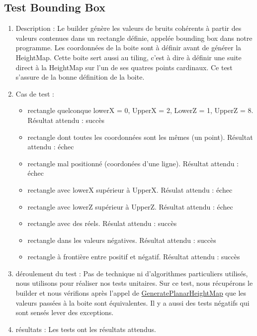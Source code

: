 \documentclass[12pt]{report}
\begin{document}
\subsection{Test Bounding Box}
\begin{enumerate}
    \item Description : Le builder génère les valeurs de bruits cohérents à partir des valeurs contenues dans un rectangle définie, appelée bounding box dans notre programme. Les coordonnées de la boite sont à définir avant de générer la HeightMap. Cette boite sert aussi au tiling, c'est à dire à définir une suite direct à la HeightMap sur l'un de ses quatres points cardinaux. Ce test s'assure de la bonne définition de la boite.
    \item Cas de test : 
    \begin{itemize}
        \item rectangle quelconque lowerX = 0, UpperX = 2, LowerZ = 1, UpperZ = 8. Résultat attendu : succès
        \item rectangle dont toutes les coordonnées sont les mêmes (un point). Résultat attendu : échec
        \item rectangle mal positionné (coordonées d'une ligne). Résultat attendu : échec
        \item rectangle avec lowerX supérieur à UpperX. Résulat attendu : échec
        \item rectangle avec lowerZ supérieur à UpperZ. Résultat attendu : échec
        \item rectangle avec des réels. Résulat attendu : succès
        \item rectangle dans les valeurs négatives. Résultat attendu : succès
        \item rectangle à frontière entre positif et négatif. Résultat attendu : succès
    \end{itemize} 
    \item déroulement du test : Pas de technique ni d'algorithmes particuliers utilisés, nous utilisons  pour réaliser nos tests unitaires. Sur ce test, nous récupérons le builder et nous vérifions après l'appel de \underline{GeneratePlanarHeightMap} que les valeurs passées à la boite sont équivalentes. Il y a aussi des tests négatifs qui sont sensés lever des exceptions.
    \item résultats : Les tests ont les résultats attendus.
\end{enumerate}
\end{document}
